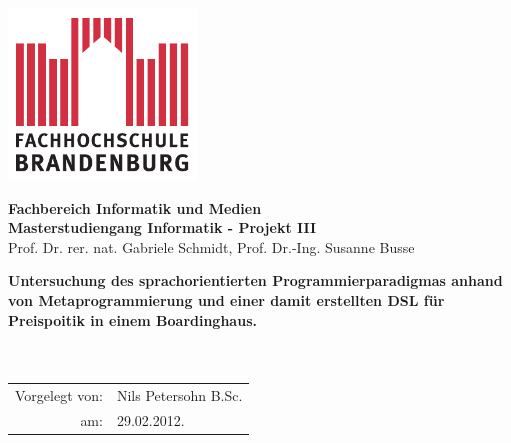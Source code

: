 \titlepage

\begin{center}
\includegraphics[width=5cm]{pics/FH-Logo}\vspace{0.5cm}

\par\end{center}

\noindent \begin{center}
\textsf{\textbf{\Large Fachbereich Informatik und Medien }}\\ 
\textsf{\textbf{\Large Masterstudiengang
Informatik - Projekt III  }}\\  
\textsf{Prof. Dr. rer. nat. Gabriele Schmidt, Prof. Dr.-Ing. Susanne Busse}\\  
\vspace{1cm}

\par\end{center}

\begin{center}
\textsf{\textbf{\huge Untersuchung des sprachorientierten
Programmierparadigmas anhand von Metaprogrammierung und einer damit
erstellten DSL für Preispoitik in einem Boardinghaus.\\
}}\textsf{}\\ \textsf{}\

\par\end{center}{\Large \par}

\vspace{2cm}


\noindent \begin{center}
{\huge }\begin{tabular}{rl}
Vorgelegt von: & Nils Petersohn B.Sc. \tabularnewline am: &
29.02.2012.\tabularnewline
\end{tabular}
\par\end{center}{\huge \par}

